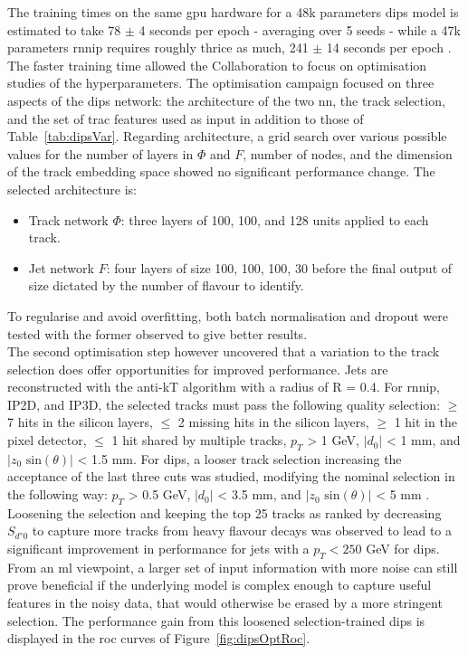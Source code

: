 The training times on the same \gls{gpu} hardware for a 48k parameters \gls{dips} model is estimated to take 78 $\pm$ 4 seconds per epoch - averaging over 5 seeds - while a 47k parameters \gls{rnnip} requires roughly thrice as much, 241 $\pm$ 14 seconds per epoch \cite{ATL-PHYS-PUB-2020-014}. The faster training time allowed the Collaboration to focus on optimisation studies of the hyperparameters. The optimisation campaign focused on three aspects of the \gls{dips} network: the architecture of the two \gls{nn}, the track selection, and the set of trac features used as input in addition to those of Table~\ref{tab:dipsVar}. Regarding architecture, a grid search over various possible values for the number of layers in $\Phi$ and $F$, number of nodes, and the dimension of the track embedding space showed no significant performance change. The selected architecture is:
\begin{itemize}
  \item Track network $\Phi$: three layers of 100, 100, and 128 units applied to each track. 
  \item Jet network $F$: four layers of size 100, 100, 100, 30 before the final output of size dictated by the number of flavour to identify. 
\end{itemize}
To regularise and avoid overfitting, both batch normalisation and dropout were tested with the former observed to give better results. \\ 

The second optimisation step however uncovered that a variation to the track selection does offer opportunities for improved performance. Jets are reconstructed with the anti-kT algorithm with a radius of R = 0.4. For \gls{rnnip}, IP2D, and IP3D, the selected tracks must pass the following quality selection: $\geq$ 7 hits in the silicon layers, $\leq$ 2 missing hits in the silicon layers, $\geq$ 1 hit in the pixel detector, $\leq$ 1 hit shared by multiple tracks, $p_T$ > 1 GeV, $|d_0|$ < 1 mm, and $|z_0 \textrm{ sin}(\theta)|$ < 1.5 mm. For \gls{dips}, a looser track selection increasing the acceptance of the last three cuts was studied, modifying the nominal selection in the following way: $p_T$ > 0.5 GeV, $|d_0|$ < 3.5 mm, and $|z_0 \textrm{ sin}(\theta)|$ < 5 mm \cite{ATL-PHYS-PUB-2020-014}. Loosening the selection and keeping the top 25 tracks as ranked by decreasing $S_{d°0}$ to capture more tracks from heavy flavour decays was observed to lead to a significant improvement in performance for jets with a $p_T < 250$ GeV for \gls{dips}. From an \gls{ml} viewpoint, a larger set of input information with more noise can still prove beneficial if the underlying model is complex enough to capture useful features in the noisy data, that would otherwise be erased by a more stringent selection. The performance gain from this loosened selection-trained \gls{dips} is displayed in the \gls{roc} curves of Figure~\ref{fig:dipsOptRoc}. \\


